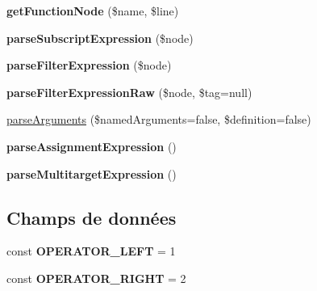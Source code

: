 \begin{DoxyCompactItemize}
\item 
{\bfseries get\+Function\+Node} (\$name, \$line)\hypertarget{class_twig___expression_parser_acf5750a843dfd9532b700e0e28c83381}{}\label{class_twig___expression_parser_acf5750a843dfd9532b700e0e28c83381}

\item 
{\bfseries parse\+Subscript\+Expression} (\$node)\hypertarget{class_twig___expression_parser_a39de613eaf1404c8b0e3e676feaf5131}{}\label{class_twig___expression_parser_a39de613eaf1404c8b0e3e676feaf5131}

\item 
{\bfseries parse\+Filter\+Expression} (\$node)\hypertarget{class_twig___expression_parser_aa34dd7e6733af986a5d59be68e0cc24e}{}\label{class_twig___expression_parser_aa34dd7e6733af986a5d59be68e0cc24e}

\item 
{\bfseries parse\+Filter\+Expression\+Raw} (\$node, \$tag=null)\hypertarget{class_twig___expression_parser_a042523e3f2021f368ceee6ce9fd2ea0e}{}\label{class_twig___expression_parser_a042523e3f2021f368ceee6ce9fd2ea0e}

\item 
\hyperlink{class_twig___expression_parser_ab55e89493a082dc4ec12ebf98482f066}{parse\+Arguments} (\$named\+Arguments=false, \$definition=false)
\item 
{\bfseries parse\+Assignment\+Expression} ()\hypertarget{class_twig___expression_parser_a9d63b236eb972c8932a82eb72b6b74d2}{}\label{class_twig___expression_parser_a9d63b236eb972c8932a82eb72b6b74d2}

\item 
{\bfseries parse\+Multitarget\+Expression} ()\hypertarget{class_twig___expression_parser_a723d955922d5703cae23f36dcdbfdc06}{}\label{class_twig___expression_parser_a723d955922d5703cae23f36dcdbfdc06}

\end{DoxyCompactItemize}
\subsection*{Champs de données}
\begin{DoxyCompactItemize}
\item 
const {\bfseries O\+P\+E\+R\+A\+T\+O\+R\+\_\+\+L\+E\+FT} = 1\hypertarget{class_twig___expression_parser_abe5a3390382bf3aba3867940eec28a61}{}\label{class_twig___expression_parser_abe5a3390382bf3aba3867940eec28a61}

\item 
const {\bfseries O\+P\+E\+R\+A\+T\+O\+R\+\_\+\+R\+I\+G\+HT} = 2\hypertarget{class_twig___expression_parser_a90a1202797b2ac98156a907ac86d0052}{}\label{class_twig___expression_parser_a90a1202797b2ac98156a907ac86d0052}

\end{DoxyCompactItemize}
